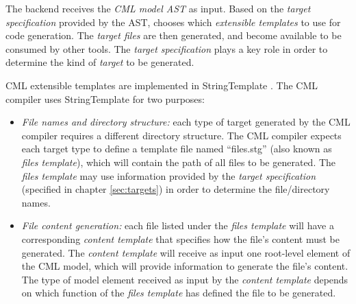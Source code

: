 The backend receives the \emph{CML model AST} as input.
Based on the \emph{target specification} provided by the AST, chooses which \emph{extensible templates} to use for code generation.
The \emph{target files} are then generated, and become available to be consumed by other tools. The \emph{target specification} plays a key role in order to determine the kind of \emph{target} to be generated.

CML extensible templates are implemented in StringTemplate \cite{st}.  The CML compiler uses StringTemplate for two purposes:

\begin{itemize}
\item \emph{File names and directory structure:}
each type of target generated by the CML compiler requires a different directory structure.
The CML compiler expects each target type to define a template file named ``files.stg'' (also known as \emph{files template}),
which will contain the path of all files to be generated. The \emph{files template} may use information provided by the \emph{target specification} (specified in chapter \ref{sec:targets}) in order to determine the file/directory names.
\item \emph{File content generation:}
each file listed under the \emph{files template} will have a corresponding \emph{content template} that specifies how the file's content must be generated. The \emph{content template} will receive as input one root-level element of the CML model, which will provide information to generate the file's content. The type of model element received as input by the \emph{content template} depends on which function of the \emph{files template} has defined the file to be generated.
\end{itemize}
